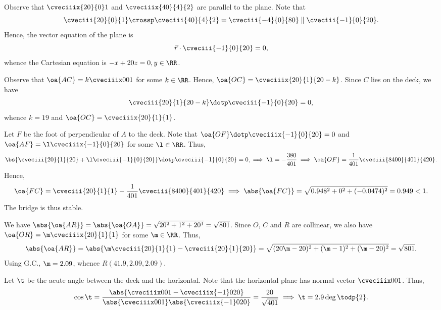 \begin{solution}
    \begin{ppart}
        Observe that $\cveciiix{20}{0}1$ and $\cveciiix{40}{4}{2}$ are parallel to the plane. Note that \[\cveciii{20}{0}{1} \crossp \cveciii{40}{4}{2} = \cveciii{-4}{0}{80} \parallel \cveciii{-1}{0}{20}.\] Hence, the vector equation of the plane is \[\vec r \cdot \cveciii{-1}{0}{20} = 0,\] whence the Cartesian equation is $-x + 20 z = 0, y \in \RR$.
    \end{ppart}
    \begin{ppart}
        Observe that $\oa{AC} = k\cveciiix001$ for some $k \in \RR$. Hence, $\oa{OC} = \cveciiix{20}{1}{20-k}$. Since $C$ lies on the deck, we have \[\cveciii{20}{1}{20-k} \dotp \cveciii{-1}{0}{20} = 0,\] whence $k = 19$ and $\oa{OC} = \cveciiix{20}{1}{1}$.

        Let $F$ be the foot of perpendicular of $A$ to the deck. Note that $\oa{OF} \dotp \cveciiix{-1}{0}{20} = 0$ and $\oa{AF} = \l \cveciiix{-1}{0}{20}$ for some $\l \in \RR$. Thus, \[\bs{\cveciii{20}{1}{20} + \l\cveciii{-1}{0}{20}} \dotp \cveciii{-1}{0}{20} = 0, \implies \l = -\frac{380}{401} \implies \oa{OF} = \frac1{401} \cveciii{8400}{401}{420}.\] Hence, \[\oa{FC} = \cveciii{20}{1}{1} - \frac1{401} \cveciii{8400}{401}{420} \implies \abs{\oa{FC}} = \sqrt{0.948^2 + 0^2 + (-0.0474)^2} = 0.949 < 1.\] The bridge is thus stable.
    \end{ppart}
    \begin{ppart}
        We have $\abs{\oa{AR}} = \abs{\oa{OA}} = \sqrt{20^2 + 1^2 + 20^1} = \sqrt{801}$. Since $O$, $C$ and $R$ are collinear, we also have $\oa{OR} = \m \cveciiix{20}{1}{1}$ for some $\m \in \RR$. Thus, \[\abs{\oa{AR}} = \abs{\m \cveciii{20}{1}{1} - \cveciii{20}{1}{20}} = \sqrt{(20\m-20)^2 + (\m - 1)^2 + (\m - 20)^2} = \sqrt{801}.\] Using G.C., $\m = 2.09$, whence $R(41.9, 2.09, 2.09)$.
    \end{ppart}
    \begin{ppart}
        Let $\t$ be the acute angle between the deck and the horizontal. Note that the horizontal plane has normal vector $\cveciiix001$. Thus, \[\cos \t = \frac{\abs{\cveciiix001 - \cveciiix{-1}0{20}}}{\abs{\cveciiix001}\abs{\cveciiix{-1}0{20}}} = \frac{20}{\sqrt{401}} \implies \t = 2.9\deg \todp{2}.\]
    \end{ppart}
\end{solution}

